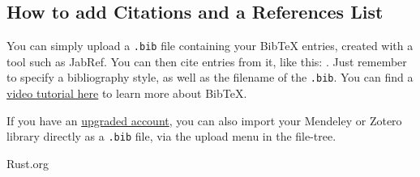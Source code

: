 \documentclass{article}
\begin{document}
\subsection{How to add Citations and a References List}

You can simply upload a \verb|.bib| file containing your BibTeX entries, created with a tool such as JabRef. You can then cite entries from it, like this: \cite{greenwade93}. Just remember to specify a bibliography style, as well as the filename of the \verb|.bib|. You can find a \href{https://www.overleaf.com/help/97-how-to-include-a-bibliography-using-bibtex}{video tutorial here} to learn more about BibTeX.

If you have an \href{https://www.overleaf.com/user/subscription/plans}{upgraded account}, you can also import your Mendeley or Zotero library directly as a \verb|.bib| file, via the upload menu in the file-tree.

Rust.org



\end{document}
